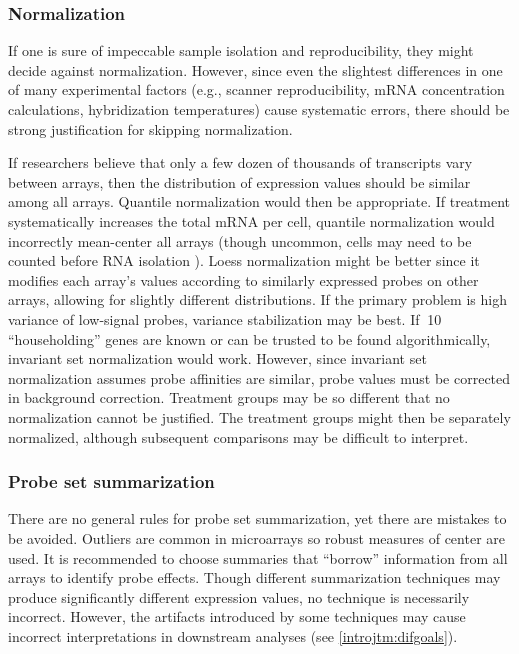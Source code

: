 \subsubsection{Normalization}

If one is sure of impeccable sample isolation and
reproducibility, they might decide against normalization. 
However, since even the slightest differences in one of many experimental factors 
(e.g., scanner reproducibility, mRNA concentration calculations, hybridization
temperatures) cause systematic errors, there should be strong 
justification for skipping normalization.

If researchers believe that only a few dozen
of thousands of transcripts vary between arrays, then the distribution
of expression values should be similar among all arrays. Quantile
normalization would then be appropriate. If treatment
systematically increases the total mRNA per cell, quantile
normalization would incorrectly mean-center all arrays 
(though uncommon, cells may need to be counted before RNA isolation \cite{Loven:2012km}).
Loess normalization might be better since it 
modifies each array's values according to similarly expressed 
probes on other arrays, allowing for slightly different distributions.
If the primary problem is high variance of low-signal probes, variance
stabilization may be best. If $~$10 ``householding'' genes are known
or can be trusted to be found algorithmically, invariant set normalization
would work. However, since invariant set normalization assumes probe affinities
are similar, probe values must be corrected in background correction.
Treatment groups may be so different that
no normalization cannot be justified. The treatment groups might then
be separately normalized, although subsequent comparisons may be difficult to interpret.

\subsubsection{Probe set summarization}

There are no general rules for probe set summarization, yet
there are mistakes to be avoided. Outliers are common in microarrays
so robust measures of center are used.
It is recommended to choose summaries
that ``borrow'' information from all arrays to identify probe effects.
Though different summarization techniques may produce significantly
different expression values, no technique is necessarily incorrect.
However, the artifacts introduced by some techniques may
cause incorrect interpretations in downstream analyses (see \ref{introjtm:difgoals}).

